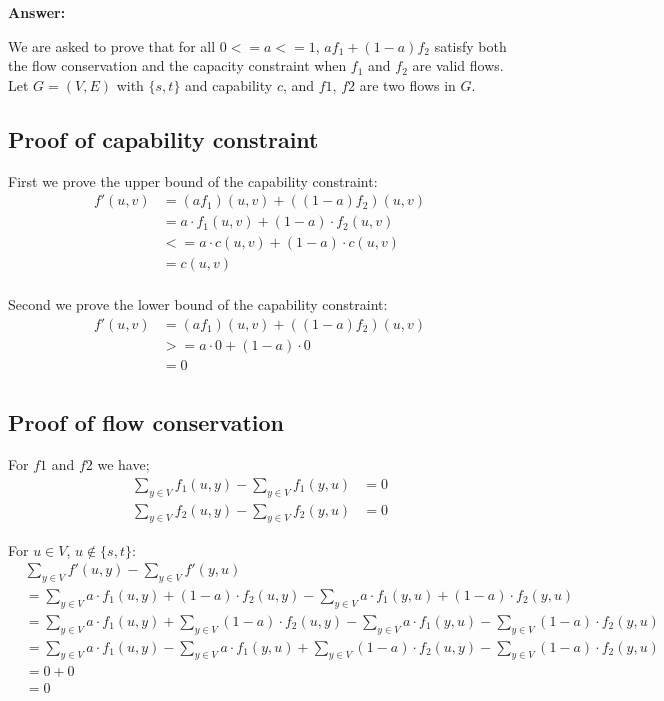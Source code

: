\documentclass[12pt]{article}
\begin{document}
\textbf{Answer:}

We are asked to prove that for all $0<=a<=1$, $af_1+(1-a)f_2$ satisfy both the flow conservation and the capacity constraint when $f_1$ and $f_2$ are valid flows. Let $G=(V,E)$ with $\{s, t\}$ and capability $c$, and $f1$, $f2$ are two flows in $G$.


\subsection{Proof of capability constraint}
First we prove the upper bound of the capability constraint:
\begin{equation}
\begin{aligned}
f'(u,v) &= (af_1)(u,v)+((1-a)f_2)(u,v) \\
 &= a \cdot f_1(u,v)+(1-a) \cdot  f_2(u,v) \\
 &<= a \cdot c(u,v)+(1-a) \cdot  c(u,v) \\
 &= c(u,v) \\
\end{aligned}
\end{equation}

Second we prove the lower bound of the capability constraint:
\begin{equation}
\begin{aligned}
f'(u,v) &= (af_1)(u,v)+((1-a)f_2)(u,v) \\
 &>= a \cdot 0+(1-a) \cdot 0 \\
 &= 0 \\
\end{aligned}
\end{equation}


\subsection{Proof of flow conservation}

For $f1$ and $f2$ we have;
\begin{equation}
\begin{aligned}
\sum_{y \in V} f_1(u,y) - \sum_{y \in V} f_1(y,u) &= 0 \\
\sum_{y \in V} f_2(u,y) - \sum_{y \in V} f_2(y,u) &= 0
\end{aligned}
\end{equation}


For $u \in V$, $u \notin \{s, t\}$: 
\begin{equation}
\begin{aligned}
&\sum_{y \in V} f'(u,y) - \sum_{y \in V} f'(y,u) \\
&= \sum_{y \in V} a \cdot f_1(u,y) + (1-a) \cdot f_2(u,y)  - \sum_{y \in V}  a \cdot f_1(y,u) + (1-a) \cdot f_2(y,u)\\ 
&= \sum_{y \in V} a \cdot f_1(u,y) + \sum_{y \in V}(1-a) \cdot f_2(u,y) - \sum_{y \in V}  a \cdot f_1(y,u) -  \sum_{y \in V}  (1-a) \cdot f_2(y,u)\\
&= \sum_{y \in V} a \cdot f_1(u,y)  - \sum_{y \in V}  a \cdot f_1(y,u) + \sum_{y \in V}(1-a) \cdot f_2(u,y) -  \sum_{y \in V}  (1-a) \cdot f_2(y,u)\\
&= 0 + 0\\
&= 0
\end{aligned}
\end{equation}
\end{document}
